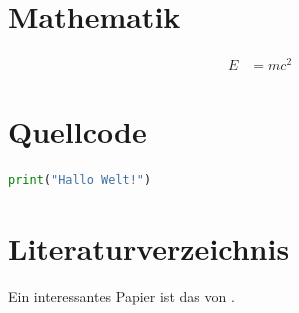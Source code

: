 \documentclass[12pt,a4paper]{scrartcl}
\begin{document}
\section{Mathematik}
\begin{align}
  E &= mc^2
\end{align}

\section{Quellcode}
\begin{lstlisting}[language=Python]
print("Hallo Welt!")
\end{lstlisting}

\section{Literaturverzeichnis}
Ein interessantes Papier ist das von \textcite{beispiel}.
\end{document}
